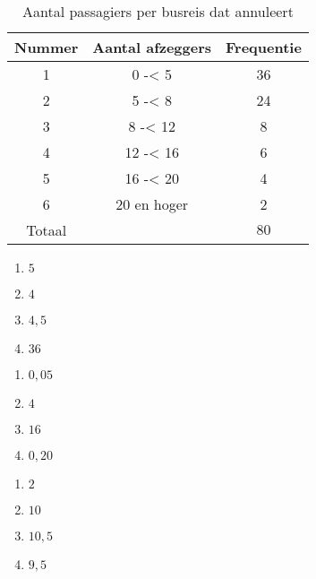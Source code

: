 \begin{table}[h!]
    \centering
    \caption*{Aantal passagiers per busreis dat annuleert}
    \begin{tabular}{ccc}
        \toprule
            {\bfseries Nummer} & {\bfseries Aantal afzeggers} & {\bfseries Frequentie} \\
        \midrule
            1 & 0 -< 5 & 36 \\
            2 & 5 -< 8 & 24 \\
            3 & 8 -< 12 & 8 \\
            4 & 12 -< 16 & 6 \\
            5 & 16 -< 20 & 4 \\
            6 & 20 en hoger & 2 \\
        \midrule    
            Totaal & & $80$ \\
        \bottomrule
    \end{tabular}
\end{table}

\begin{enumerate}[label=(\alph*)]
    \item $5$
    \item $4$
    \item $4,5$
    \item $36$
\end{enumerate}

\begin{enumerate}[label=(\alph*)]
    \item $0,05$
    \item $4$
    \item $16$
    \item $0,20$
\end{enumerate}

\begin{enumerate}[label=(\alph*)]
    \item $2$
    \item $10$
    \item $10,5$
    \item $9,5$
\end{enumerate}

